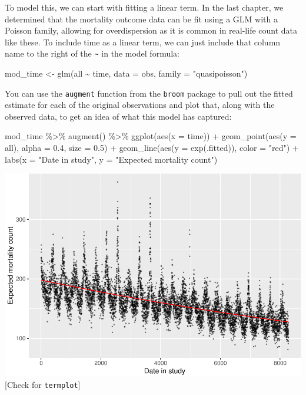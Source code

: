 \documentclass[
]{book}
\newenvironment{Shaded}{\begin{snugshade}}{\end{snugshade}}
\newcommand{\AttributeTok}[1]{\textcolor[rgb]{0.77,0.63,0.00}{#1}}
\newcommand{\FloatTok}[1]{\textcolor[rgb]{0.00,0.00,0.81}{#1}}
\newcommand{\FunctionTok}[1]{\textcolor[rgb]{0.00,0.00,0.00}{#1}}
\newcommand{\NormalTok}[1]{#1}
\newcommand{\OtherTok}[1]{\textcolor[rgb]{0.56,0.35,0.01}{#1}}
\newcommand{\SpecialCharTok}[1]{\textcolor[rgb]{0.00,0.00,0.00}{#1}}
\newcommand{\StringTok}[1]{\textcolor[rgb]{0.31,0.60,0.02}{#1}}
\begin{document}
To model this, we can start with fitting a linear term. In the last chapter,
we determined that the mortality outcome data can be fit using a GLM with a
Poisson family, allowing for overdispersion as it is common in real-life
count data like these. To include time as a linear term, we can just include
that column name to the right of the \texttt{\textasciitilde{}} in the model formula:

\begin{Shaded}
\begin{Highlighting}[]
\NormalTok{mod\_time }\OtherTok{\textless{}{-}} \FunctionTok{glm}\NormalTok{(all }\SpecialCharTok{\textasciitilde{}}\NormalTok{ time, }
                \AttributeTok{data =}\NormalTok{ obs, }\AttributeTok{family =} \StringTok{"quasipoisson"}\NormalTok{)}
\end{Highlighting}
\end{Shaded}

You can use the \texttt{augment} function from the \texttt{broom} package to pull out the
fitted estimate for each of the original observations and plot that, along
with the observed data, to get an idea of what this model has captured:

\begin{Shaded}
\begin{Highlighting}[]
\NormalTok{mod\_time }\SpecialCharTok{\%\textgreater{}\%} 
  \FunctionTok{augment}\NormalTok{() }\SpecialCharTok{\%\textgreater{}\%} 
  \FunctionTok{ggplot}\NormalTok{(}\FunctionTok{aes}\NormalTok{(}\AttributeTok{x =}\NormalTok{ time)) }\SpecialCharTok{+} 
  \FunctionTok{geom\_point}\NormalTok{(}\FunctionTok{aes}\NormalTok{(}\AttributeTok{y =}\NormalTok{ all), }\AttributeTok{alpha =} \FloatTok{0.4}\NormalTok{, }\AttributeTok{size =} \FloatTok{0.5}\NormalTok{) }\SpecialCharTok{+} 
  \FunctionTok{geom\_line}\NormalTok{(}\FunctionTok{aes}\NormalTok{(}\AttributeTok{y =} \FunctionTok{exp}\NormalTok{(.fitted)), }\AttributeTok{color =} \StringTok{"red"}\NormalTok{) }\SpecialCharTok{+} 
  \FunctionTok{labs}\NormalTok{(}\AttributeTok{x =} \StringTok{"Date in study"}\NormalTok{, }\AttributeTok{y =} \StringTok{"Expected mortality count"}\NormalTok{) }
\end{Highlighting}
\end{Shaded}

\includegraphics{adv_epi_analysis_files/figure-latex/unnamed-chunk-50-1.pdf}
{[}Check for \texttt{termplot}{]}
\end{document}
